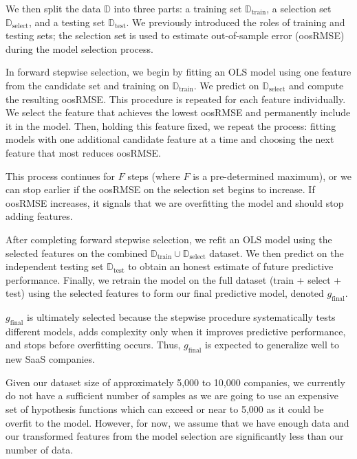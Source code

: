 \documentclass[12pt]{article}
\begin{document}
We then split the data \( \mathbb{D} \) into three parts: a training set \( \mathbb{D}_{\text{train}} \), a selection set \( \mathbb{D}_{\text{select}} \), and a testing set \( \mathbb{D}_{\text{test}} \). We previously introduced the roles of training and testing sets; the selection set is used to estimate out-of-sample error (oosRMSE) during the model selection process.

In forward stepwise selection, we begin by fitting an OLS model using one feature from the candidate set and training on \( \mathbb{D}_{\text{train}} \). We predict on \( \mathbb{D}_{\text{select}} \) and compute the resulting oosRMSE. This procedure is repeated for each feature individually. We select the feature that achieves the lowest oosRMSE and permanently include it in the model. Then, holding this feature fixed, we repeat the process: fitting models with one additional candidate feature at a time and choosing the next feature that most reduces oosRMSE.

This process continues for \( F \) steps (where \( F \) is a pre-determined maximum), or we can stop earlier if the oosRMSE on the selection set begins to increase. If oosRMSE increases, it signals that we are overfitting the model and should stop adding features.

After completing forward stepwise selection, we refit an OLS model using the selected features on the combined \( \mathbb{D}_{\text{train}} \cup \mathbb{D}_{\text{select}} \) dataset. We then predict on the independent testing set \( \mathbb{D}_{\text{test}} \) to obtain an honest estimate of future predictive performance. Finally, we retrain the model on the full dataset (train + select + test) using the selected features to form our final predictive model, denoted \( g_{\text{final}} \).

\( g_{\text{final}} \) is ultimately selected because the stepwise procedure systematically tests different models, adds complexity only when it improves predictive performance, and stops before overfitting occurs. Thus, \( g_{\text{final}} \) is expected to generalize well to new SaaS companies.

Given our dataset size of approximately 5,000 to 10,000 companies, we currently do not have a sufficient number of samples as we are going to use an expensive set of hypothesis functions which can exceed or near to 5,000 as it could be overfit to the model. However, for now, we assume that we have enough data and our transformed features from the model selection are significantly less than our number of data.  
\end{document}
